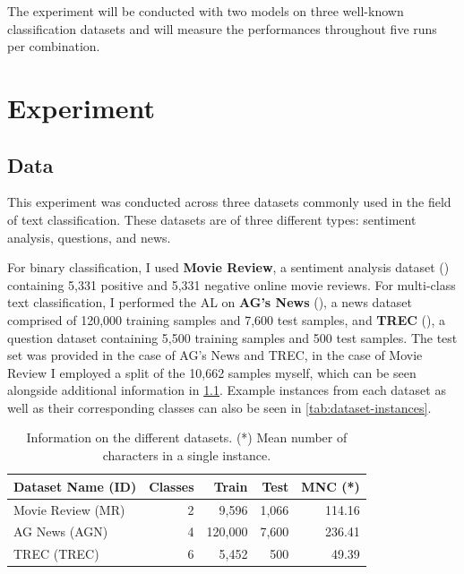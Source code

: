 \documentclass[english,bachelor,ul]{webisthesis} %
\begin{document}
The experiment will be conducted with two models on three well-known classification datasets and will measure the performances throughout five runs per combination. 

\chapter{Experiment}

\section{Data}

This experiment was conducted across three datasets commonly used in the field of text classification. These datasets are of three different types: sentiment analysis, questions, and news. 

For binary classification, I used \textbf{Movie Review}, a sentiment analysis dataset (\cite{DBLP:conf/acl/PangL05}) containing 5,331 positive and 5,331 negative online movie reviews. For multi-class text classification, I performed the AL on \textbf{AG's News} (\cite{DBLP:conf/nips/ZhangZL15}), a news dataset comprised of 120,000 training samples and 7,600 test samples, and \textbf{TREC} (\cite{DBLP:journals/nle/LiR06}), a question dataset containing 5,500 training samples and 500 test samples. The test set was provided in the case of AG's News and TREC, in the case of Movie Review I employed a split of the 10,662 samples myself, which can be seen alongside additional information in \ref{tab:dataset-table}. Example instances from each dataset as well as their corresponding classes can also be seen in \ref{tab:dataset-instances}.


\begin{table}[p]%
    \centering
    \setlength{\tabcolsep}{16pt} %
    \begin{tabular}{@{}lrrrr@{}} %
        \toprule
        \bfseries Dataset Name \scriptsize (ID) & \bfseries Classes & \bfseries Train & \bfseries Test & \bfseries MNC (*) \\
        \midrule
        Movie Review \scriptsize (MR) & 2 & 9,596 & 1,066 & 114.16 \\
        AG News \scriptsize (AGN) & 4 & 120,000 & 7,600 &  236.41 \\
        TREC \scriptsize (TREC) & 6 & 5,452 & 500 & 49.39 \\
        \bottomrule
    \end{tabular}
    \caption{Information on the different datasets. (*) Mean number of characters in a single instance.}
  \label{tab:dataset-table}%
\end{table}
\end{document}
